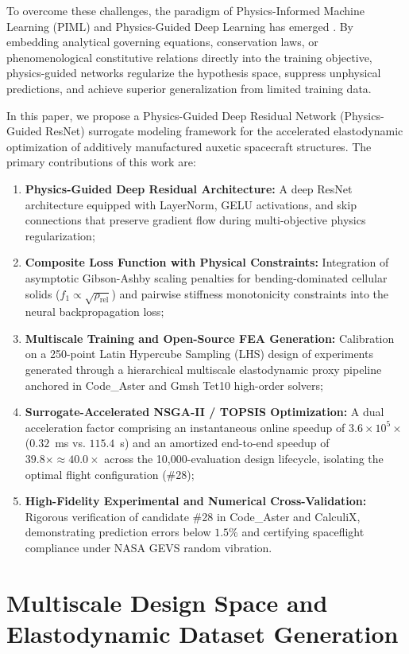 \documentclass[preprint,12pt,3p]{elsarticle}
\begin{document}
To overcome these challenges, the paradigm of Physics-Informed Machine Learning (PIML) and Physics-Guided Deep Learning has emerged \cite{zheng2024}. By embedding analytical governing equations, conservation laws, or phenomenological constitutive relations directly into the training objective, physics-guided networks regularize the hypothesis space, suppress unphysical predictions, and achieve superior generalization from limited training data.

In this paper, we propose a Physics-Guided Deep Residual Network (Physics-Guided ResNet) surrogate modeling framework for the accelerated elastodynamic optimization of additively manufactured auxetic spacecraft structures. The primary contributions of this work are:
\begin{enumerate}
  \item \textbf{Physics-Guided Deep Residual Architecture:} A deep ResNet architecture equipped with LayerNorm, GELU activations, and skip connections that preserve gradient flow during multi-objective physics regularization;
  \item \textbf{Composite Loss Function with Physical Constraints:} Integration of asymptotic Gibson-Ashby scaling penalties for bending-dominated cellular solids ($f_1 \propto \sqrt{\rho_{\text{rel}}}$) and pairwise stiffness monotonicity constraints into the neural backpropagation loss;
  \item \textbf{Multiscale Training and Open-Source FEA Generation:} Calibration on a 250-point Latin Hypercube Sampling (LHS) design of experiments generated through a hierarchical multiscale elastodynamic proxy pipeline anchored in Code\_Aster and Gmsh Tet10 high-order solvers;
  \item \textbf{Surrogate-Accelerated NSGA-II / TOPSIS Optimization:} A dual acceleration factor comprising an instantaneous online speedup of $3.6 \times 10^5\times$ ($0.32$~ms vs. $115.4$~s) and an amortized end-to-end speedup of $39.8\times \approx 40.0\times$ across the 10,000-evaluation design lifecycle, isolating the optimal flight configuration (\#28);
  \item \textbf{High-Fidelity Experimental and Numerical Cross-Validation:} Rigorous verification of candidate \#28 in Code\_Aster and CalculiX, demonstrating prediction errors below $1.5\%$ and certifying spaceflight compliance under NASA GEVS random vibration.
\end{enumerate}

\section{Multiscale Design Space and Elastodynamic Dataset Generation}
\label{sec:dataset}
\end{document}
